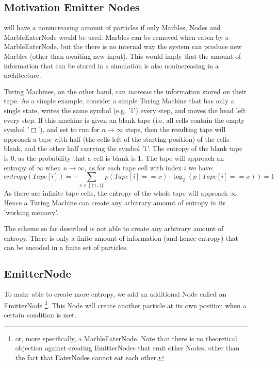 \subsection{Motivation Emitter Nodes}
\nenwin will have a nonincreasing amount of particles if only Marbles, Nodes and MarbleEaterNode would be used.
Marbles can be removed when eaten by a MarbleEaterNode, but the there is no internal way the system can produce new Marbles (other than awaiting new input).
This would imply that the amount of information that can be stored in a \nenwin simulation is also nonincreasing in a \nenwin architecture.

Turing Machines, on the other hand, can \textit{increase} the information stored on their tape. As a simple example, consider a simple Turing Machine that has only a single state, writes the same symbol (e.g. '1') every step, and moves the head left every step. If this machine is given an blank tape (i.e. all cells contain the empty symbol '$\Box$'), and set to run for $n \rightarrow \infty$ steps, then the resulting tape will approach a tape with half (the cells left of the starting position) of the cells blank, and the other half carrying the symbol '1'. The entropy of the blank tape is 0, as the probability that a cell is blank is 1. The tape will approach an entropy of $\infty$ when $n \rightarrow \infty$, as for each tape cell with index $i$ we have:
\begin{equation}
    entropy(Tape[i]) = -\sum_{x \in \{\Box, 1\}}p(Tape[i] == x)\cdot\log_2(p(Tape[i] == x)) = 1
\end{equation}
As there are infinite tape cells, the entropy of the whole tape will approach $\infty$. Hence a Turing Machine can create any arbitrary amount of entropy in its 'working memory'.

The \nenwin scheme so far described is not able to create any arbitrary amount of entropy. There is only a finite amount of information (and hence entropy) that can be encoded in a finite set of particles.

\subsection{EmitterNode}
To make \nenwin able to create more entropy, we add an additional Node called an EmitterNode \footnote{or, more specifically, a MarbleEaterNode. Note that there is no theoretical objection against creating EmitterNodes that emit other Nodes, other than the fact that EaterNodes cannot eat each other.}. This Node will create another particle at its own position when a certain condition is met.

